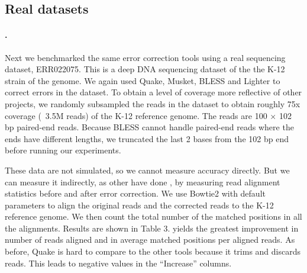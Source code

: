 \documentclass{bmcart}
\begin{document}



\subsection*{Real datasets}
\paragraph{\ecoli.}  Next we benchmarked the same error correction tools using a real sequencing dataset, ERR022075.
This is a deep DNA sequencing dataset of the the K-12 strain of the \ecoli genome.
We again used Quake, Musket, BLESS and Lighter to correct errors in the dataset.
To obtain a level of coverage more reflective of other projects, we randomly subsampled the reads in the dataset to obtain roughly 75x coverage (~3.5M reads) of the \ecoli K-12 reference genome.
The reads are 100 $\times$ 102 bp paired-end reads.
Because BLESS cannot handle paired-end reads where the ends have different lengths, we truncated the last 2 bases from the 102 bp end before running our experiments.

 
These data are not simulated, so we cannot measure accuracy directly.  But we can measure it indirectly, as other have done \cite{heo2014bless}, by measuring read alignment statistics before and after error correction.  We use Bowtie2 \cite{langmead2012fast} with default parameters to align the original reads and the corrected reads to the \ecoli K-12 reference genome.  We then count the total number of the matched positions in all the alignments.  Results are shown in Table 3.  \tool yields the greatest improvement in number of reads aligned and in average matched positions per aligned reads.  As before, Quake is hard to compare to the other tools because it trims and discards reads.  This leads to negative values in the ``Increase'' columns.
\end{document}
